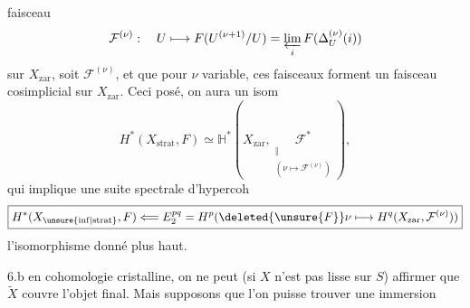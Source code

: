 faisceau
\[
\mathcal F^{(\nu)}:\quad U\longmapsto F(U^{(\nu+1)}/U)=\varprojlim_i F(\Delta_U^{(\nu)}(i))
\]
sur $X_{\mathrm{zar}}$, soit $\mathcal F^{(\nu)}$, et que pour $\nu$ variable, ces faisceaux forment un faisceau cosimplicial sur $X_{\mathrm{zar}}$. Ceci posé, on aura un isom
\[
H^*(X_{\mathrm{strat}},F)\simeq\mathbb H^*(X_{\mathrm{zar}},\underset{\substack{\Vert\\(\nu\mapsto\mathcal F^{(\nu)})}}{\mathcal F^*}),
\]
qui implique une suite spectrale d'hypercoh
\[
\boxed{H^*(X_{\unsure{\mathrm{inf}|\mathrm{strat}}},F)\Longleftarrow
E_2^{pq}=H^p(\deleted{\unsure{F}}\nu\longmapsto H^q(X_{\mathrm{zar}},\mathcal F^{(\nu)}))}
\]
 l'isomorphisme donné plus haut.


6.b  en cohomologie cristalline, on ne peut (si $X$ n'est pas  lisse sur $S$) affirmer que $\widetilde X$ couvre l'objet final. Mais supposons que l'on puisse trouver une immersion
